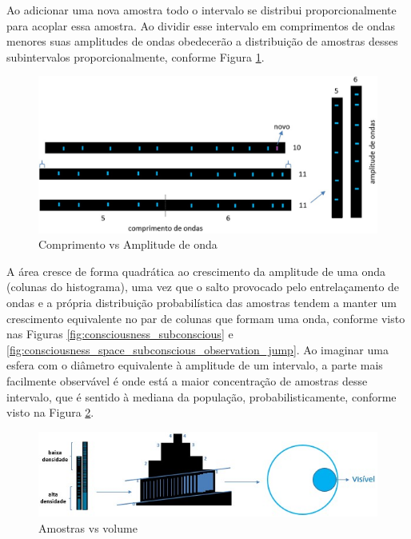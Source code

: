 Ao adicionar uma nova amostra todo o intervalo se distribui proporcionalmente para acoplar essa amostra. Ao dividir esse intervalo em comprimentos de ondas menores suas amplitudes de ondas obedecerão a distribuição de amostras desses subintervalos proporcionalmente, conforme Figura \ref{fig:consciousness_space_volume_amplitude}.
	\begin{figure}[H]
	\caption{Comprimento vs Amplitude de onda}
	\label{fig:consciousness_space_volume_amplitude}
	\centering
	\includegraphics[scale=.4]{sections/images/consciousness_space_volume_amplitude.jpg}
	\end{figure}
	
A área cresce de forma quadrática ao crescimento da amplitude de uma onda (colunas do histograma), uma vez que o salto provocado pelo entrelaçamento de ondas e a própria distribuição probabilística das amostras tendem a manter um crescimento equivalente no par de colunas que formam uma onda, conforme visto nas Figuras \ref{fig:consciousness_subconscious} e \ref{fig:consciousness_space_subconscious_observation_jump}. Ao imaginar uma esfera com o diâmetro equivalente à amplitude de um intervalo, a parte mais facilmente observável é onde está a maior concentração de amostras desse intervalo, que é sentido à mediana da população, probabilisticamente, conforme visto na Figura \ref{fig:consciousness_space_volume}.
	\begin{figure}[H]
	\caption{Amostras vs volume}
	\label{fig:consciousness_space_volume}
	\centering
	\includegraphics[scale=1]{sections/images/consciousness_space_volume.jpg}
	\end{figure}

